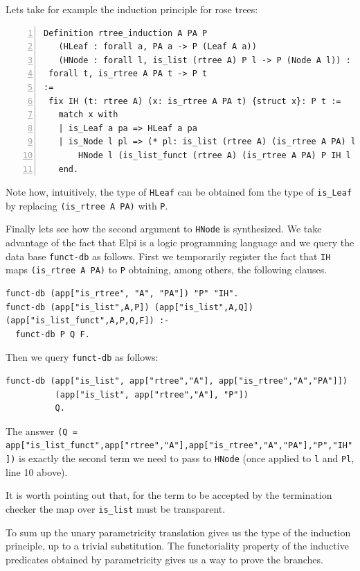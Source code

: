 \documentclass[a4paper,UKenglish,cleveref, autoref]{lipics-v2019}
\begin{document}
Lets take for example the induction principle for rose trees:

\begin{lstlisting}[numbers=left]
Definition rtree_induction A PA P  
   (HLeaf : forall a, PA a -> P (Leaf A a))
   (HNode : forall l, is_list (rtree A) P l -> P (Node A l)) :
 forall t, is_rtree A PA t -> P t
:=
 fix IH (t: rtree A) (x: is_rtree A PA t) {struct x}: P t :=
   match x with
   | is_Leaf a pa => HLeaf a pa
   | is_Node l pl => (* pl: is_list (rtree A) (is_rtree A PA) l *)
       HNode l (is_list_funct (rtree A) (is_rtree A PA) P IH l pl)
   end.
\end{lstlisting}

Note how, intuitively, the type of \lstinline+HLeaf+ can be obtained fom the
type of \lstinline+is_Leaf+ by replacing \lstinline+(is_rtree A PA)+
with \lstinline+P+.

Finally lets see  how the second argument to \lstinline+HNode+ is
synthesized.  We take advantage of the fact that Elpi is a logic
programming language and we query the data base \lstinline+funct-db+
as follows. First we temporarily register 
the fact that \lstinline+IH+ maps
\lstinline+(is_rtree A PA)+ to \lstinline+P+ obtaining, among others,
the following clauses.

\begin{lstlisting}[]
funct-db (app["is_rtree", "A", "PA"]) "P" "IH".
funct-db (app["is_list",A,P]) (app["is_list",A,Q]) (app["is_list_funct",A,P,Q,F]) :-
  funct-db P Q F.
\end{lstlisting}

Then we query \lstinline+funct-db+ as follows:

\begin{lstlisting}[]
funct-db (app["is_list", app["rtree","A"], app["is_rtree","A","PA"]])
          (app["is_list", app["rtree","A"], "P"])
          Q.
\end{lstlisting}

\noindent
The answer \lstinline+(Q = app["is_list_funct",app["rtree","A"],app["is_rtree","A","PA"],"P","IH"])+
is exactly the second term we need to pass to \lstinline+HNode+
(once applied to \lstinline+l+ and \lstinline+Pl+, line 10 above).

It is worth pointing out that, for the term to be accepted
by the termination checker the map over \lstinline+is_list+
must be transparent.

To sum up the unary parametricity translation gives us the type
of the induction principle, up to a trivial substitution.
The functoriality property of the inductive predicates obtained by
parametricity gives us a way to prove the branches.
\end{document}
